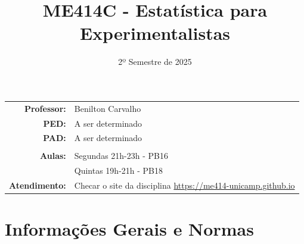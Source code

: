 \documentclass[paper=letter, fontsize=12pt]{scrartcl} %
\title{\normalfont \LARGE ME414C - Estatística para Experimentalistas}
\subtitle{2º Semestre de 2025}
\author{}
\date{}
\begin{document}
\maketitle

\vspace{-1.5cm}

\noindent
\begin{tabular}{rl}
\textbf{Professor:} & 	 Benilton Carvalho \\
\textbf{PED:} 	    & A ser determinado \\
\textbf{PAD:} 	    & A ser determinado \\
\\
\textbf{Aulas:} & Segundas 21h-23h - PB16\\
                & Quintas 19h-21h - PB18 \\
\textbf{Atendimento:} & Checar o site da disciplina \href{https://me414-unicamp.github.io}{https://me414-unicamp.github.io}\\



\end{tabular}

\section{Informações Gerais e Normas}
\end{document}
